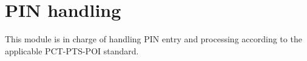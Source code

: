\hypertarget{group__pcibx___p_i_n}{}\section{P\+IN handling}
\label{group__pcibx___p_i_n}
This module is in charge of handling P\+IN entry and processing according to the applicable P\+C\+T-\/\+P\+T\+S-\/\+P\+OI standard. 